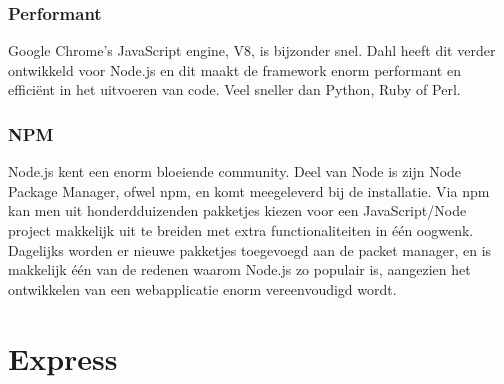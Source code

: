 \subsubsection{Performant}
\label{sec:fast}

Google Chrome's JavaScript engine, V8, is bijzonder snel. Dahl heeft dit verder ontwikkeld voor Node.js en dit maakt de framework enorm performant en efficiënt in het uitvoeren van code. Veel sneller dan Python, Ruby of Perl.

\subsubsection{NPM}
\label{sec:npm}

Node.js kent een enorm bloeiende community. Deel van Node is zijn Node Package Manager, ofwel npm, en komt meegeleverd bij de installatie. Via npm kan men uit honderdduizenden pakketjes kiezen voor een JavaScript/Node project makkelijk uit te breiden met extra functionaliteiten in één oogwenk. Dagelijks worden er nieuwe pakketjes toegevoegd aan de packet manager, en is makkelijk één van de redenen waarom Node.js zo populair is, aangezien het ontwikkelen van een webapplicatie enorm vereenvoudigd wordt.   



\section{Express}
\label{sec:express}




 






 
